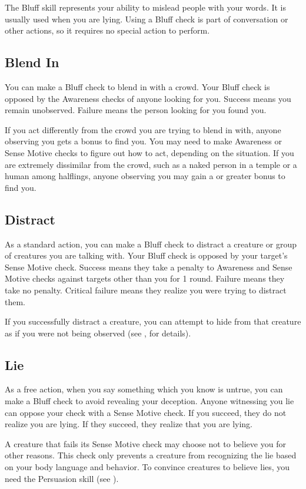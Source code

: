         The Bluff skill represents your ability to mislead people with your words. It is usually used when you are lying. Using a Bluff check is part of conversation or other actions, so it requires no special action to perform.

    \subsection{Blend In}
        You can make a Bluff check to blend in with a crowd. Your Bluff check is opposed by the Awareness checks of anyone looking for you. Success means you remain unobserved. Failure means the person looking for you found you.

        If you act differently from the crowd you are trying to blend in with, anyone observing you gets a  bonus to find you. You may need to make Awareness or Sense Motive checks to figure out how to act, depending on the situation. If you are extremely dissimilar from the crowd, such as a naked person in a temple or a human among halflings, anyone observing you may gain a  or greater bonus to find you.

    \subsection{Distract}
        As a standard action, you can make a Bluff check to distract a creature or group of creatures you are talking with. Your Bluff check is opposed by your target's Sense Motive check. Success means they take a  penalty to Awareness and Sense Motive checks against targets other than you for 1 round. Failure means they take no penalty. Critical failure means they realize you were trying to distract them.

        If you successfully distract a creature, you can attempt to hide from that creature as if you were not being observed (see , for details).

    \subsection{Lie}
        As a free action, when you say something which you know is untrue, you can make a Bluff check to avoid revealing your deception. Anyone witnessing you lie can oppose your check with a Sense Motive check. If you succeed, they do not realize you are lying. If they succeed, they realize that you are lying.

        A creature that fails its Sense Motive check may choose not to believe you for other reasons. This check only prevents a creature from recognizing the lie based on your body language and behavior. To convince creatures to believe lies, you need the Persuasion skill (see ).

